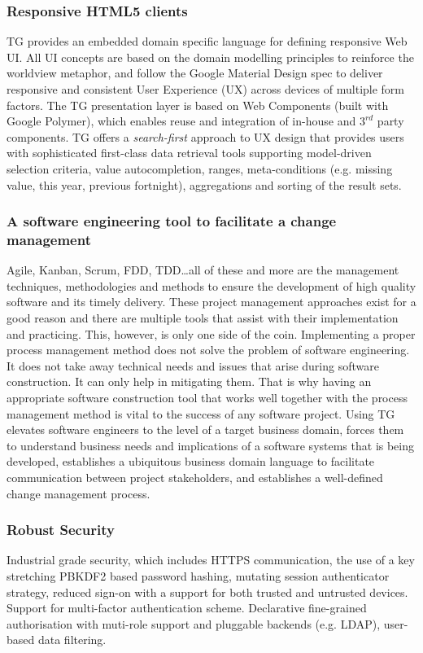 \documentclass[a4paper,10pt,twocolumn,oneside,openright,final]{memoir}
\begin{document}

\subsubsection*{Responsive HTML5 clients}
	TG provides an embedded domain specific language for defining responsive Web UI.
	All UI concepts are based on the domain modelling principles to reinforce the worldview metaphor, and follow the Google Material Design spec to deliver responsive and consistent User Experience (UX) across devices of multiple form factors.
	The TG presentation layer is based on Web Components (built with Google Polymer), which enables reuse and integration of in-house and $3^{rd}$ party components.
	TG offers a \emph{search-first} approach to UX design that provides users with sophisticated first-class data retrieval tools supporting model-driven selection criteria, value autocompletion, ranges, meta-conditions (e.g. missing value, this year, previous fortnight), aggregations and sorting of the result sets. 

	
\subsubsection*{A software engineering tool to facilitate a change management}
	Agile, Kanban, Scrum, FDD, TDD\ldots all of these and more are the management techniques, methodologies and methods to ensure the development of high quality software and its timely delivery.
	These project management approaches exist for a good reason and there are multiple tools that assist with their implementation and practicing.
	This, however, is only one side of the coin.
	Implementing a proper process management method does not solve the problem of software engineering.
	It does not take away technical needs and issues that arise during software construction.
	It can only help in mitigating them.
	That is why having an appropriate software construction tool that works well together with the process management method is vital to the success of any software project.
	Using TG elevates software engineers to the level of a target business domain, forces them to understand business needs and implications of a software systems that is being developed, establishes a ubiquitous business domain language to facilitate communication between project stakeholders, and establishes a well-defined change management process.

\subsubsection*{Robust Security}
	Industrial grade security, which includes HTTPS communication, the use of a key stretching PBKDF2 based password hashing, mutating session authenticator strategy, reduced sign-on with a support for both trusted and untrusted devices. 
	Support for multi-factor authentication scheme. 
	Declarative fine-grained authorisation with muti-role support and pluggable backends (e.g. LDAP), user-based data filtering.
\end{document}
